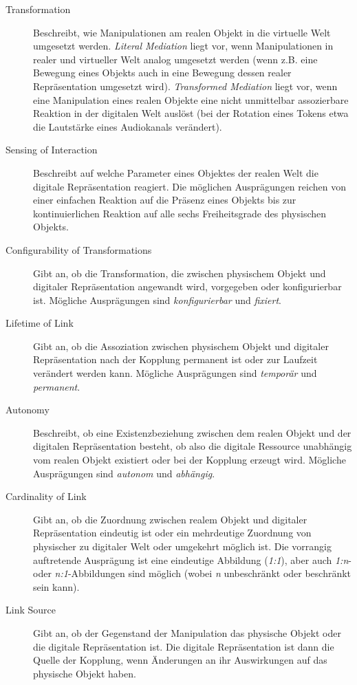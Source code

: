 \begin{description}
	\item[Transformation] Beschreibt, wie Manipulationen am realen Objekt in die virtuelle Welt umgesetzt werden. \emph{Literal Mediation} liegt vor, wenn Manipulationen in realer und virtueller Welt analog umgesetzt werden (wenn z.B. eine Bewegung eines Objekts auch in eine Bewegung dessen realer Repräsentation umgesetzt wird). \emph{Transformed Mediation} liegt vor, wenn eine Manipulation eines realen Objekte eine nicht unmittelbar assozierbare Reaktion in der digitalen Welt auslöst (bei der Rotation eines Tokens etwa die Lautstärke eines Audiokanals verändert).
	\item[Sensing of Interaction] Beschreibt auf welche Parameter eines Objektes der realen Welt die digitale Repräsentation reagiert. Die möglichen Ausprägungen reichen von einer einfachen Reaktion auf die Präsenz eines Objekts bis zur kontinuierlichen Reaktion auf alle sechs Freiheitsgrade des physischen Objekts.
	\item[Configurability of Transformations] Gibt an, ob die Transformation, die zwischen physischem Objekt und digitaler Repräsentation angewandt wird, vorgegeben oder konfigurierbar ist. Mögliche Ausprägungen sind \emph{konfigurierbar} und \emph{fixiert}.
	\item[Lifetime of Link] Gibt an, ob die Assoziation zwischen physischem Objekt und digitaler Repräsentation nach der Kopplung permanent ist oder zur Laufzeit verändert werden kann. Mögliche Ausprägungen sind \emph{temporär} und \emph{permanent}.
	\item[Autonomy] Beschreibt, ob eine Existenzbeziehung zwischen dem realen Objekt und der digitalen Repräsentation besteht, ob also die digitale Ressource unabhängig vom realen Objekt existiert oder bei der Kopplung erzeugt wird. Mögliche Ausprägungen sind \emph{autonom} und \emph{abhängig}.
	\item[Cardinality of Link] Gibt an, ob die Zuordnung zwischen realem Objekt und digitaler Repräsentation eindeutig ist oder ein mehrdeutige Zuordnung von physischer zu digitaler Welt oder umgekehrt möglich ist. Die vorrangig auftretende Ausprägung ist eine eindeutige Abbildung (\emph{1:1}), aber auch \emph{1:n}- oder \emph{n:1}-Abbildungen sind möglich (wobei \emph{n} unbeschränkt oder beschränkt sein kann).
	\item[Link Source] Gibt an, ob der Gegenstand der Manipulation das physische Objekt oder die digitale Repräsentation ist. Die digitale Repräsentation ist dann die Quelle der Kopplung, wenn Änderungen an ihr Auswirkungen auf das physische Objekt haben.
\end{description}

